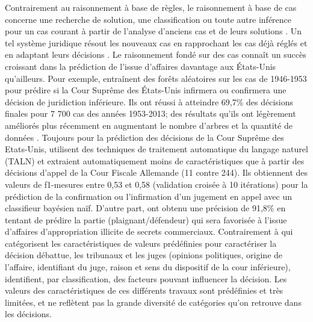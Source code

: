 Contrairement au raisonnement à base de règles, le raisonnement à base de cas concerne une recherche de solution, une classification ou toute autre inférence pour un cas courant à partir de l'analyse d'anciens cas et de leurs solutions \citep{moens2002case-basedreasoning}. Un tel système juridique résout les nouveaux cas en rapprochant les cas déjà réglés et en adaptant leurs décisions \citep{Berka2011rbr-cbr}. Le raisonnement fondé sur des cas connaît un succès croissant dans la prédiction de l'issue d'affaires davantage aux États-Unis qu'ailleurs. Pour exemple, \citet{katz2014predicting} entraînent des forêts aléatoires sur les cas de 1946-1953 pour prédire si la Cour Suprême des États-Unis infirmera ou confirmera une décision de juridiction inférieure. Ils ont réussi à atteindre 69,7\% des décisions finales pour 7 700 cas des années 1953-2013; des résultats qu'ils ont légèrement améliorés plus récemment en augmentant le nombre d'arbres et la quantité de données \citep{katz2017predictsupremecourt}. Toujours pour la prédiction des décisions de la Cour Suprême des Etats-Unis, \citet{waltl2017predictgermantaxlaw} utilisent des techniques de traitement automatique du langage naturel (TALN) et extraient automatiquement moins de caractéristiques que \citep{katz2014predicting}  à partir des décisions d'appel de la Cour Fiscale Allemande (11 contre 244). Ils obtiennent des valeurs de f1-mesures entre 0,53 et 0,58 (validation croisée à 10 itérations) pour la prédiction  de la confirmation ou l'infirmation d'un jugement en appel avec un classifieur bayésien naïf.  D'autre part, \cite{Ashley2009classifCases} ont obtenu une précision de 91,8\% en tentant de prédire la partie (plaignant/défendeur)  qui sera favorisée  à l'issue d'affaires d'appropriation illicite de secrets commerciaux. Contrairement à \citep{katz2014predicting} qui catégorisent les caractéristiques de valeurs prédéfinies pour caractériser la décision débattue, les tribunaux et les juges (opinions politiques, origine de l'affaire, identifiant du juge, raison et sens du dispositif de la cour inférieure), \cite{Ashley2009classifCases} identifient, par classification, des facteurs pouvant influencer la décision. Les valeurs des caractéristiques de ces différents travaux sont prédéfinies et très limitées, et ne reflètent pas la grande diversité de catégories qu'on retrouve dans les décisions. 

